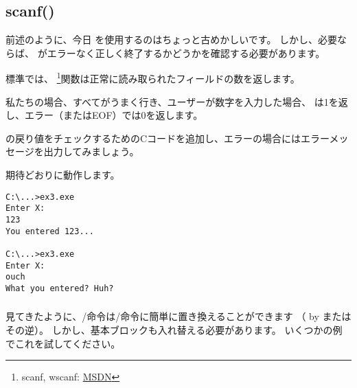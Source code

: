 \subsection{scanf()}

前述のように、今日 \scanf を使用するのはちょっと古めかしいです。 
しかし、必要ならば、 \scanf がエラーなく正しく終了するかどうかを確認する必要があります。



標準では、 \scanf \footnote{scanf, wscanf: \href{http://msdn.microsoft.com/en-us/library/9y6s16x1(VS.71).aspx}{MSDN}}関数は正常に読み取られたフィールドの数を返します。

私たちの場合、すべてがうまく行き、ユーザーが数字を入力した場合、 \scanf は1を返し、エラー（または\ac{EOF}）では0を返します。

\scanf の戻り値をチェックするためのCコードを追加し、エラーの場合にはエラーメッセージを出力してみましょう。

期待どおりに動作します。

\begin{lstlisting}
C:\...>ex3.exe
Enter X:
123
You entered 123...

C:\...>ex3.exe
Enter X:
ouch
What you entered? Huh?
\end{lstlisting}






\subsubsection{\Exercise}

見てきたように、/命令は/命令に簡単に置き換えることができます
（ by またはその逆）。 
しかし、基本ブロックも入れ替える必要があります。 
いくつかの例でこれを試してください。
